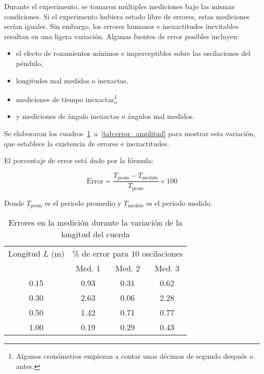 \documentclass[twocolumn]{article}
\numberwithin{table}{section}
\begin{document}
Durante el experimento, se tomaron múltiples mediciones bajo las mismas
condiciones. Si el experimento hubiera estado libre de errores, estas
mediciones serían iguales. Sin embargo, los errores humanos e inexactitudes
inevitables resultan en una ligera variación. Algunas fuentes de
error posibles incluyen:

\begin{itemize}
  \item el efecto de rozamientos mínimos e imperceptibles sobre las
    oscilaciones del péndulo,
  \item longitudes mal medidas o inexactas,
  \item mediciones de tiempo inexactas\footnote{Algunos cronómetros
    empiezan a contar unas décimas de segundo después o antes.}
  \item y mediciones de ángulo inexactas o ángulos mal medidos.
\end{itemize}

Se elaboraron los cuadros~\ref{tab:error_longitud}~a~\ref{tab:error_amplitud}
para mostrar esta variación, que establece la existencia de errores e
inexactitudes.

El porcentaje de error está dado por la fórmula:

\begin{equation}
  \text{Error} = \frac{T_{\text{prom}} -
  T_{\text{medido}}}{T_{\text{prom}}} \times 100
\end{equation}

Donde $T_{\text{prom}}$ es el periodo promedio y $T_{\text{medido}}$ es
el periodo medido.

\begin{table}[ht]
  \centering
  \begin{tabular}{cccc}
    \toprule
    Longitud $L$ (m) & \multicolumn{3}{c}{\% de error para $10$
    oscilaciones} \\
    \cmidrule(lr){2-4}
    & Med. 1 & Med. 2 & Med. 3  \\
    \midrule
    0.15 & 0.93 & 0.31 & 0.62 \\
    0.30 & 2.63 & 0.06 & 2.28 \\
    0.50 & 1.42 & 0.71 & 0.77 \\
    1.00 & 0.19 & 0.29 & 0.43 \\
    \bottomrule
  \end{tabular}
  \caption{Errores en la medición durante la variación de la
  longitud del cuerda}\label{tab:error_longitud}
\end{table}
\end{document}
